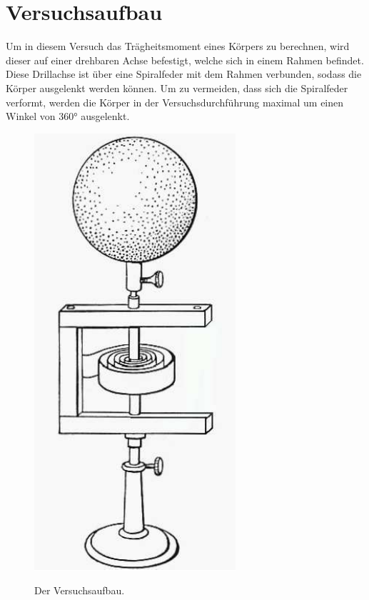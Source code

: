 \section{Versuchsaufbau}
Um in diesem Versuch das Trägheitsmoment eines Körpers zu berechnen, wird dieser auf einer drehbaren Achse 
befestigt, welche sich in einem Rahmen befindet. Diese Drillachse ist über eine Spiralfeder mit dem Rahmen verbunden,
sodass die Körper ausgelenkt werden können. Um zu vermeiden, dass sich die Spiralfeder verformt, werden die Körper
in der Versuchsdurchführung maximal um einen Winkel von 360° ausgelenkt. 

\begin{figure}
\centering
\includegraphics[scale=.5]{V101Bild.png}
\label{fig:abb2}
\caption{Der Versuchsaufbau.\cite[3]{anleitung101}}
\end{figure}
